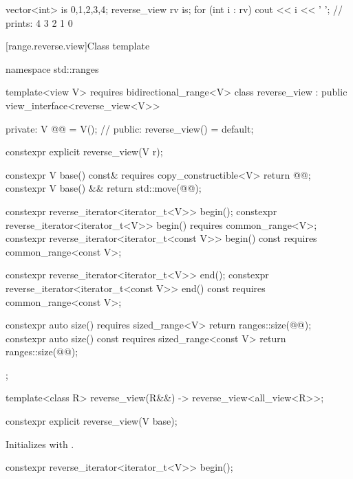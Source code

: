 \pnum
\begin{example}
\begin{codeblock}
vector<int> is {0,1,2,3,4};
reverse_view rv {is};
for (int i : rv)
  cout << i << ' '; // prints: 4 3 2 1 0
\end{codeblock}
\end{example}

[range.reverse.view]{Class template }

%
%
%
\begin{codeblock}
namespace std::ranges {
  template<view V>
    requires bidirectional_range<V>
  class reverse_view : public view_interface<reverse_view<V>> {
  private:
    V @@ = V();  // \expos
  public:
    reverse_view() = default;

    constexpr explicit reverse_view(V r);

    constexpr V base() const& requires copy_constructible<V> { return @@; }
    constexpr V base() && { return std::move(@@); }

    constexpr reverse_iterator<iterator_t<V>> begin();
    constexpr reverse_iterator<iterator_t<V>> begin() requires common_range<V>;
    constexpr reverse_iterator<iterator_t<const V>> begin() const
      requires common_range<const V>;

    constexpr reverse_iterator<iterator_t<V>> end();
    constexpr reverse_iterator<iterator_t<const V>> end() const
      requires common_range<const V>;

    constexpr auto size() requires sized_range<V> {
      return ranges::size(@@);
    }
    constexpr auto size() const requires sized_range<const V> {
      return ranges::size(@@);
    }
  };

  template<class R>
    reverse_view(R&&) -> reverse_view<all_view<R>>;
}
\end{codeblock}

%
\begin{itemdecl}
constexpr explicit reverse_view(V base);
\end{itemdecl}

\begin{itemdescr}
\pnum
\effects
Initializes  with .
\end{itemdescr}

%
\begin{itemdecl}
constexpr reverse_iterator<iterator_t<V>> begin();
\end{itemdecl}

